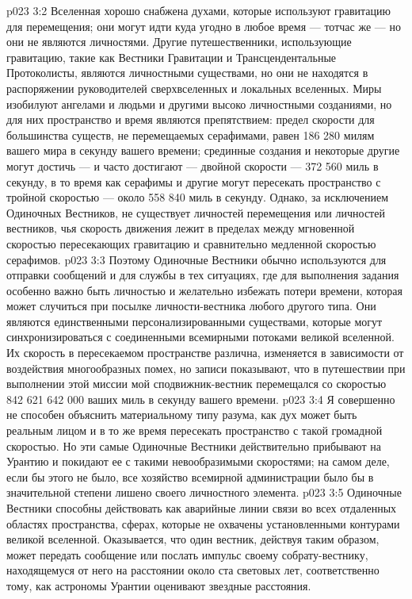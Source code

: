 \vs p023 3:2 \pc Вселенная хорошо снабжена духами, которые используют гравитацию для перемещения; они могут идти куда угодно в любое время --- тотчас же --- но они не являются личностями. Другие путешественники, использующие гравитацию, такие как Вестники Гравитации и Трансцендентальные Протоколисты, являются личностными существами, но они не находятся в распоряжении руководителей сверхвселенных и локальных вселенных. Миры изобилуют ангелами и людьми и другими высоко личностными созданиями, но для них пространство и время являются препятствием: предел скорости для большинства существ, не перемещаемых серафимами, равен 186 280 милям вашего мира в секунду вашего времени; срединные создания и некоторые другие могут достичь --- и часто достигают --- двойной скорости --- 372 560 миль в секунду, в то время как серафимы и другие могут пересекать пространство с тройной скоростью --- около 558 840 миль в секунду. Однако, за исключением Одиночных Вестников, не существует личностей перемещения или личностей вестников, чья скорость движения лежит в пределах между мгновенной скоростью пересекающих гравитацию и сравнительно медленной скоростью серафимов.
\vs p023 3:3 Поэтому Одиночные Вестники обычно используются для отправки сообщений и для службы в тех ситуациях, где для выполнения задания особенно важно быть личностью и желательно избежать потери времени, которая может случиться при посылке личности\hyp{}вестника любого другого типа. Они являются единственными персонализированными существами, которые могут синхронизироваться с соединенными всемирными потоками великой вселенной. Их скорость в пересекаемом пространстве различна, изменяется в зависимости от воздействия многообразных помех, но записи показывают, что в путешествии при выполнении этой миссии мой сподвижник\hyp{}вестник перемещался со скоростью 842 621 642 000 ваших миль в секунду вашего времени.
\vs p023 3:4 Я совершенно не способен объяснить материальному типу разума, как дух может быть реальным лицом и в то же время пересекать пространство с такой громадной скоростью. Но эти самые Одиночные Вестники действительно прибывают на Урантию и покидают ее с такими невообразимыми скоростями; на самом деле, если бы этого не было, все хозяйство всемирной администрации было бы в значительной степени лишено своего личностного элемента.
\vs p023 3:5 \pc Одиночные Вестники способны действовать как аварийные линии связи во всех отдаленных областях пространства, сферах, которые не охвачены установленными контурами великой вселенной. Оказывается, что один вестник, действуя таким образом, может передать сообщение или послать импульс своему собрату\hyp{}вестнику, находящемуся от него на расстоянии около ста световых лет, соответственно тому, как астрономы Урантии оценивают звездные расстояния.

